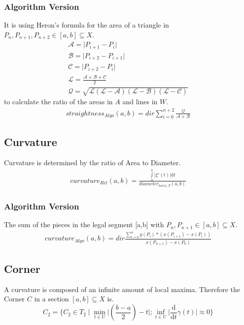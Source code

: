 \documentclass{report}
\begin{document}
\subsubsection{Algorithm Version}
It is using Heron's formula for the area of a triangle in $P_{n}, P_{n+1},P_{n+2} \in [a,b] \subseteq X$.
\begin{align*}
\mathcal{A}=\lvert P_{i+1}-P_{i} \rvert\\
\mathcal{B}=\lvert P_{i+2} - P_{i+1} \rvert\\
\mathcal{C}=\lvert P_{i+2} - P_{i} \rvert\\
\mathcal{L}=\frac{\mathcal{A}+\mathcal{B}+\mathcal{C}}{2}\\
\mathcal{Q}=\sqrt{\mathcal{L}(\mathcal{L}-\mathcal{A})(\mathcal{L}-\mathcal{B})(\mathcal{L}-\mathcal{C})}
\end{align*}
to calculate the ratio of the areas in $A$ and lines in $W$.
\begin{align}
straightness_{Algo}(a,b)=dir \sum_{i=0}^{n+2}\frac{\mathcal{Q}}{\mathcal{A}+\mathcal{B}}
\end{align}

\subsection{Curvature}
Curvature is determined by the ratio of Area to Diameter.
\begin{align}
curvature_{Rel}(a,b) = \frac{\int \limits _{a}^{b} \lvert \xi'(t) \rvert \mathrm{d}t}{diameter_{horiz,T}(a,b)}
\end{align}
\subsubsection{Algorithm Version}
The sum of the pieces in the legal segment [a,b] with $P_{n}, P_{n+1} \in [a,b] \subseteq X$.
\begin{align}
curvature_{Algo}(a,b)= dir \frac{\sum \limits _{i=0}^{n}y(P_{i})*(x(P_{i+1})-x(P_{i}))}{x(P_{n+1})-x(P_{0})}
\end{align}

\subsection{Corner}
A curvature is composed of an infinite amount of local maxima. Therefore the Corner $C$ in a section $[a,b] \subseteq X$ is.
\begin{equation}
C_{2} = \{C_{2} \in T_{2} \mid \min_{t \in U}\lvert(\frac{b-a}{2})-t\rvert;\inf_{t \in U} \lvert \frac{\mathrm{d}}{\mathrm{d}t}\gamma(t) \rvert \approx 0 \}
\end{equation}
\end{document}
